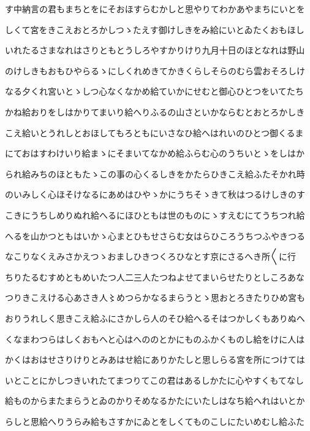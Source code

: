 \documentclass[a4paper,11pt,landscape]{ltjtarticle}
\begin{document}
\par\medskip
す中納言の君もまちとをにそおほすらむかしと思やりてわかあやまちにいとを
\par\medskip
しくて宮をきこえおとろかしつゝたえす御けしきをみ給にいとゐたくおもほし
\par\medskip
いれたるさまなれはさりともとうしろやすかりけり九月十日のほとなれは野山
\par\medskip
のけしきもおもひやらるゝにしくれめきてかきくらしそらのむら雲おそろしけ
\par\medskip
なる夕くれ宮いとゝしつ心なくなかめ給ていかにせむと御心ひとつをいてたち
\par\medskip
かね給おりをしはかりてまいり給へりふるの山さといかならむとおとろかしき
\par\medskip
こえ給いとうれしとおほしてもろともにいさなひ給へはれいのひとつ御くるま
\par\medskip
にておはすわけいり給まゝにそまいてなかめ給ふらむ心のうちいとゝをしはか
\par\medskip
られ給みちのほともたゝこの事の心くるしきをかたらひきこえ給ふたそかれ時
\par\medskip
のいみしく心ほそけなるにあめはひやゝかにうちそゝきて秋はつるけしきのす
\par\medskip
こきにうちしめりぬれ給へるにほひともは世のものにゝすえむにてうちつれ給
\par\medskip
へるを山かつともはいかゝ心まとひもせさらむ女はらひころうちつふやきつる
\par\medskip
なこりなくえみさかえつゝおましひきつくろひなとす京にさるへき所〱に行
\par\medskip
ちりたるむすめともめいたつ人二三人たつねよせてまいらせたりとしころあな
\par\medskip
つりきこえける心あさき人〻めつらかなるまらうとゝ思おとろきたりひめ宮も
\par\medskip
おりうれしく思きこえ給ふにさかしら人のそひ給へるそはつかしくもありぬへ
\par\medskip
くなまわつらはしくおもへと心はへののとかにものふかくものし給をけに人は
\par\medskip
かくはおはせさりけりとみあはせ給にありかたしと思しらる宮を所につけては
\par\medskip
いとことにかしつきいれたてまつりてこの君はあるしかたに心やすくもてなし
\par\medskip
給ものからまたまらうとゐのかりそめなるかたにいたしはなち給へれはいとか
\par\medskip
らしと思給へりうらみ給もさすかにゐとをしくてものこしにたいめむし給ふた
\end{document}
